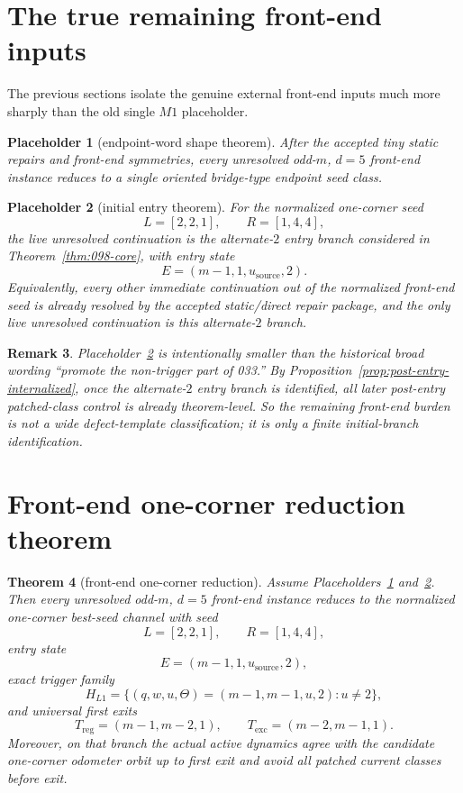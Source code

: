 \documentclass[11pt]{article}
\newtheorem{theorem}{Theorem}[section]
\newtheorem{remark}[theorem]{Remark}
\newtheorem{placeholder}[theorem]{Placeholder}
\begin{document}
\section{The true remaining front-end inputs}

The previous sections isolate the genuine external front-end inputs much more
sharply than the old single $M1$ placeholder.

\begin{placeholder}[endpoint-word shape theorem]
\label{ph:shape}
After the accepted tiny static repairs and front-end symmetries, every
unresolved odd-$m$, $d=5$ front-end instance reduces to a single oriented
bridge-type endpoint seed class.
\end{placeholder}

\begin{placeholder}[initial entry theorem]
\label{ph:entry}
For the normalized one-corner seed
\[
L=[2,2,1],\qquad R=[1,4,4],
\]
the live unresolved continuation is the alternate-$2$ entry branch considered
in Theorem~\ref{thm:098-core}, with entry state
\[
E=(m-1,1,u_{\mathrm{source}},2).
\]
Equivalently, every other immediate continuation out of the normalized front-end
seed is already resolved by the accepted static/direct repair package, and the
only live unresolved continuation is this alternate-$2$ branch.
\end{placeholder}

\begin{remark}
Placeholder~\ref{ph:entry} is intentionally smaller than the historical broad
wording ``promote the non-trigger part of 033.''
By Proposition~\ref{prop:post-entry-internalized}, once the alternate-$2$
entry branch is identified, all later post-entry patched-class control is
already theorem-level.
So the remaining front-end burden is not a wide defect-template classification;
it is only a finite initial-branch identification.
\end{remark}

\section{Front-end one-corner reduction theorem}

\begin{theorem}[front-end one-corner reduction]
\label{thm:one-corner-reduction}
Assume Placeholders~\ref{ph:shape} and~\ref{ph:entry}.
Then every unresolved odd-$m$, $d=5$ front-end instance reduces to the
normalized one-corner best-seed channel with seed
\[
L=[2,2,1],\qquad R=[1,4,4],
\]
entry state
\[
E=(m-1,1,u_{\mathrm{source}},2),
\]
exact trigger family
\[
H_{L1}=\{(q,w,u,\Theta)=(m-1,m-1,u,2):u\neq 2\},
\]
and universal first exits
\[
T_{\mathrm{reg}}=(m-1,m-2,1),
\qquad
T_{\mathrm{exc}}=(m-2,m-1,1).
\]
Moreover, on that branch the actual active dynamics agree with the candidate
one-corner odometer orbit up to first exit and avoid all patched current classes
before exit.
\end{theorem}
\end{document}
